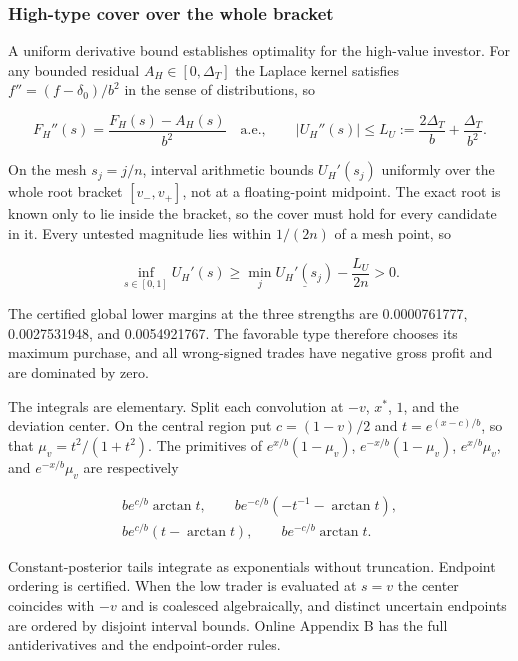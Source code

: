 \documentclass[
  12pt,
]{article}
\begin{document}
\subsubsection{High-type cover over the whole
bracket}\label{high-type-cover-over-the-whole-bracket}

A uniform derivative bound establishes optimality for the high-value
investor. For any bounded residual \(A_H\in[0,\Delta_T]\) the Laplace
kernel satisfies \(f''=(f-\delta_0)/b^2\) in the sense of distributions,
so

\[
F_H''(s)=\frac{F_H(s)-A_H(s)}{b^2}\quad\text{a.e.},\qquad
|U_H''(s)|\le L_U:=\frac{2\Delta_T}{b}+\frac{\Delta_T}{b^2}.
\tag{A.18}\label{eq:paper-a-18}
\]

On the mesh \(s_j=j/n\), interval arithmetic bounds \(U_H'(s_j)\)
uniformly over the whole root bracket \([v_-,v_+]\), not at a
floating-point midpoint. The exact root is known only to lie inside the
bracket, so the cover must hold for every candidate in it. Every
untested magnitude lies within \(1/(2n)\) of a mesh point, so

\[
\inf_{s\in[0,1]}U_H'(s)
\ge\min_j\underline{U_H'(s_j)}-\frac{L_U}{2n}>0.
\tag{A.19}\label{eq:paper-a-19}
\]

The certified global lower margins at the three strengths are
0.0000761777, 0.0027531948, and 0.0054921767. The favorable type
therefore chooses its maximum purchase, and all wrong-signed trades have
negative gross profit and are dominated by zero.

The integrals are elementary. Split each convolution at \(-v\), \(x^*\),
\(1\), and the deviation center. On the central region put \(c=(1-v)/2\)
and \(t=e^{(x-c)/b}\), so that \(\mu_v=t^2/(1+t^2)\). The primitives of
\(e^{x/b}(1-\mu_v)\), \(e^{-x/b}(1-\mu_v)\), \(e^{x/b}\mu_v\), and
\(e^{-x/b}\mu_v\) are respectively

\[
\begin{gathered}
b e^{c/b}\arctan t,\qquad
b e^{-c/b}(-t^{-1}-\arctan t),\\
b e^{c/b}(t-\arctan t),\qquad
b e^{-c/b}\arctan t.
\end{gathered}
\tag{A.20}\label{eq:paper-a-20}
\]

Constant-posterior tails integrate as exponentials without truncation.
Endpoint ordering is certified. When the low trader is evaluated at
\(s=v\) the center coincides with \(-v\) and is coalesced algebraically,
and distinct uncertain endpoints are ordered by disjoint interval
bounds. Online Appendix B has the full antiderivatives and the
endpoint-order rules.
\end{document}
